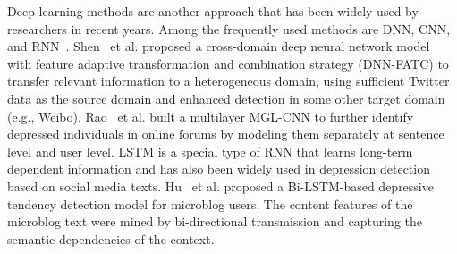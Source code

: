 Deep learning methods are another approach that has been widely used by researchers in recent years. Among the frequently used methods are DNN, CNN, and RNN~\cite{yates2017depression,shen2017depression,orabi2018deep,ive2018hierarchical}.
Shen~\cite{shen2018cross} et al. proposed a cross-domain deep neural network model with feature adaptive transformation and combination strategy (DNN-FATC) to transfer relevant information to a heterogeneous domain, using sufficient Twitter data as the source domain and enhanced detection in some other target domain (e.g., Weibo).
Rao~\cite{rao2020mgl} et al. built a multilayer MGL-CNN to further identify depressed individuals in online forums by modeling them separately at sentence level and user level.
LSTM is a special type of RNN that learns long-term dependent information and has also been widely used in depression detection based on social media texts. Hu~\cite{hu2021depression} et al. proposed a Bi-LSTM-based depressive tendency detection model for microblog users. The content features of the microblog text were mined by bi-directional transmission and capturing the semantic dependencies of the context.

